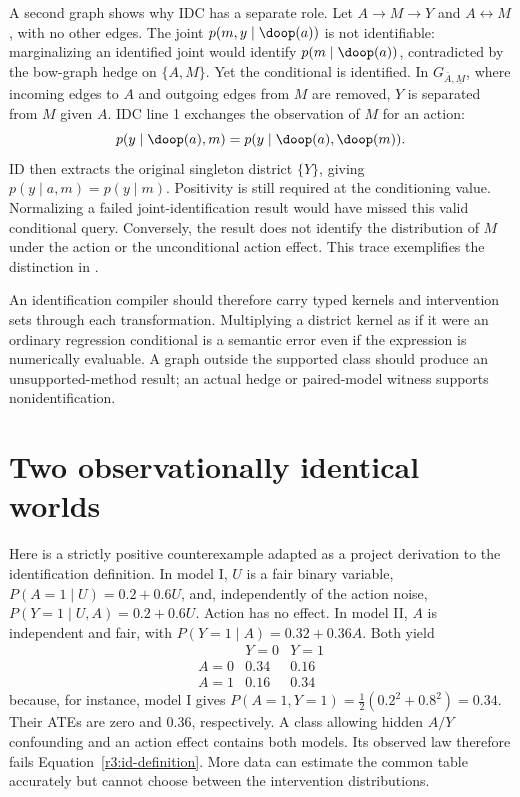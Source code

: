 A second graph shows why IDC has a separate role. Let
$A\to M\to Y$ and $A\leftrightarrow M$, with no other edges.
The joint $p(m,y\mid\doop(a))$ is not identifiable: marginalizing
an identified joint would identify $p(m\mid\doop(a))$, contradicted
by the bow-graph hedge on $\{A,M\}$. Yet the conditional is identified.
In $G_{\bar A,\underline M}$, where incoming edges to $A$ and outgoing
edges from $M$ are removed, $Y$ is separated from $M$ given $A$.
IDC line 1 exchanges the observation of $M$ for an action:
\[
 p(y\mid\doop(a),m)=p(y\mid\doop(a),\doop(m)).
\]
ID then extracts the original singleton district $\{Y\}$, giving
$p(y\mid a,m)=p(y\mid m)$. Positivity is still required at the
conditioning value. Normalizing a failed joint-identification result
would have missed this valid conditional query. Conversely, the result
does not identify the distribution of $M$ under the action or the
unconditional action effect. This trace exemplifies the distinction in
\citet[Figure 3 and Theorems 7--8]{id2006}.

An identification compiler should therefore carry typed kernels and
intervention sets through each transformation. Multiplying a district
kernel as if it were an ordinary regression conditional is a semantic
error even if the expression is numerically evaluable. A graph outside
the supported class should produce an unsupported-method result;
an actual hedge or paired-model witness supports nonidentification.

\section{Two observationally identical worlds}
\label{r3:nonidentification}
Here is a strictly positive counterexample adapted as a project derivation
to the identification definition. In model I, $U$ is a fair binary variable,
$P(A=1\mid U)=0.2+0.6U$, and, independently of the action noise,
$P(Y=1\mid U,A)=0.2+0.6U$. Action has no effect. In model II, $A$ is
independent and fair, with $P(Y=1\mid A)=0.32+0.36A$. Both yield
\[
 \begin{array}{c|cc}
  &Y=0&Y=1\\\hline
 A=0&0.34&0.16\\
 A=1&0.16&0.34
 \end{array}
\]
because, for instance, model I gives
$P(A=1,Y=1)=\tfrac12(0.2^2+0.8^2)=0.34$. Their ATEs are zero and
$0.36$, respectively. A class allowing hidden $A/Y$ confounding and an
action effect contains both models. Its observed law therefore fails
Equation~\eqref{r3:id-definition}. More data can estimate the common
table accurately but cannot choose between the intervention distributions.

